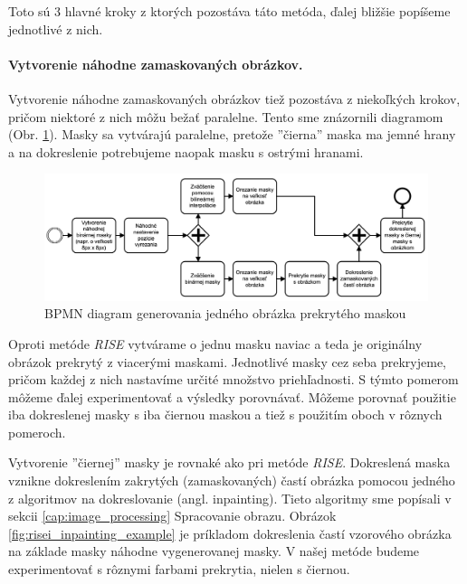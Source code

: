 Toto sú 3 hlavné kroky z ktorých pozostáva táto metóda, ďalej bližšie popíšeme jednotlivé z nich.

\paragraph{Vytvorenie náhodne zamaskovaných obrázkov.}

Vytvorenie náhodne zamaskovaných obrázkov tiež pozostáva z niekoľkých krokov, pričom niektoré z nich môžu bežať paralelne. Tento sme znázornili diagramom (Obr. \ref{fig:risei_diagram}). Masky sa vytvárajú paralelne, pretože ''čierna'' maska ma jemné hrany a na dokreslenie potrebujeme naopak masku s ostrými hranami.

\begin{figure}[h!]
    \centering
    \includegraphics[scale=0.45]{assets/images/risei_diagram.png}
    \caption{BPMN diagram generovania jedného obrázka prekrytého maskou}
    \label{fig:risei_diagram}
\end{figure}

Oproti metóde \textit{RISE} vytvárame o jednu masku naviac a teda je originálny obrázok prekrytý z viacerými maskami. Jednotlivé masky cez seba prekryjeme, pričom každej z nich nastavíme určité množstvo priehľadnosti. S týmto pomerom môžeme ďalej experimentovať a výsledky porovnávať. Môžeme porovnať použitie iba dokreslenej masky s iba čiernou maskou a tiež s použitím oboch v rôznych pomeroch.

Vytvorenie ''čiernej'' masky je rovnaké ako pri metóde \textit{RISE}. Dokreslená maska vznikne dokreslením zakrytých (zamaskovaných) častí obrázka pomocou jedného z algoritmov na dokreslovanie (angl. inpainting). Tieto algoritmy sme popísali v sekcii \ref{cap:image_processing} Spracovanie obrazu. Obrázok \ref{fig:risei_inpainting_example} je príkladom dokreslenia častí vzorového obrázka na základe masky náhodne vygenerovanej masky. V našej metóde budeme experimentovať s rôznymi farbami prekrytia, nielen s čiernou.

